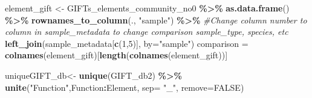 \documentclass[
]{book}
\newenvironment{Shaded}{\begin{snugshade}}{\end{snugshade}}
\newcommand{\AttributeTok}[1]{\textcolor[rgb]{0.13,0.29,0.53}{#1}}
\newcommand{\CommentTok}[1]{\textcolor[rgb]{0.56,0.35,0.01}{\textit{#1}}}
\newcommand{\ConstantTok}[1]{\textcolor[rgb]{0.56,0.35,0.01}{#1}}
\newcommand{\DecValTok}[1]{\textcolor[rgb]{0.00,0.00,0.81}{#1}}
\newcommand{\FunctionTok}[1]{\textcolor[rgb]{0.13,0.29,0.53}{\textbf{#1}}}
\newcommand{\NormalTok}[1]{#1}
\newcommand{\OtherTok}[1]{\textcolor[rgb]{0.56,0.35,0.01}{#1}}
\newcommand{\SpecialCharTok}[1]{\textcolor[rgb]{0.81,0.36,0.00}{\textbf{#1}}}
\newcommand{\StringTok}[1]{\textcolor[rgb]{0.31,0.60,0.02}{#1}}
\begin{document}
\begin{Shaded}
\begin{Highlighting}[]
\NormalTok{element\_gift }\OtherTok{\textless{}{-}}\NormalTok{ GIFTs\_elements\_community\_no0 }\SpecialCharTok{\%\textgreater{}\%} 
  \FunctionTok{as.data.frame}\NormalTok{() }\SpecialCharTok{\%\textgreater{}\%} 
  \FunctionTok{rownames\_to\_column}\NormalTok{(., }\StringTok{"sample"}\NormalTok{) }\SpecialCharTok{\%\textgreater{}\%} 
  \CommentTok{\#Change column number to column in sample\_metadata to change comparison sample\_type, species, etc}
  \FunctionTok{left\_join}\NormalTok{(sample\_metadata[}\FunctionTok{c}\NormalTok{(}\DecValTok{1}\NormalTok{,}\DecValTok{5}\NormalTok{)], }\AttributeTok{by=}\StringTok{"sample"}\NormalTok{)}
\NormalTok{comparison }\OtherTok{=} \FunctionTok{colnames}\NormalTok{(element\_gift)[}\FunctionTok{length}\NormalTok{(}\FunctionTok{colnames}\NormalTok{(element\_gift))]}

\NormalTok{uniqueGIFT\_db}\OtherTok{\textless{}{-}} \FunctionTok{unique}\NormalTok{(GIFT\_db2) }\SpecialCharTok{\%\textgreater{}\%} \FunctionTok{unite}\NormalTok{(}\StringTok{"Function"}\NormalTok{,Function}\SpecialCharTok{:}\NormalTok{Element, }\AttributeTok{sep=} \StringTok{"\_"}\NormalTok{, }\AttributeTok{remove=}\ConstantTok{FALSE}\NormalTok{)}


\end{Highlighting}
\end{Shaded}
\end{document}
